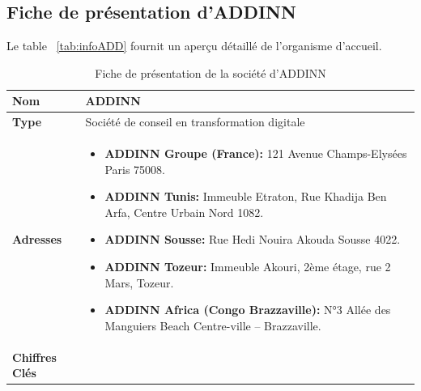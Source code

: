\subsection{Fiche de présentation d'ADDINN}
        Le table ~\ref{tab:infoADD} fournit un aperçu détaillé de l'organisme d'accueil.
        \begin{table}[H]
            \caption{\centering Fiche de présentation de la société d'ADDINN \cite{Addinn}\cite{apropos}} 
            \centering
            \renewcommand{\arraystretch}{1.5}
            \begin{tabular}{|p{2.3cm}|p{14cm}|}
                \hline
                    \textbf{Nom} & \textbf{ADDINN}\\
                \hline
                    \textbf{Type} & Société de conseil en transformation digitale\\
                \hline
                    \textbf{Adresses} & 
                        \begin{minipage}{14cm}
                            \begin{justify}
                                \vspace{0.15cm} 
                                \begin{itemize}[left=-0.1cm,label=$\bullet$]
                                    \item \textbf{ADDINN Groupe (France):} 121 Avenue Champs-Elysées Paris 75008.
                                    \item \textbf{ADDINN Tunis:} Immeuble Etraton, Rue Khadija Ben Arfa, Centre Urbain Nord 1082.
                                    \item \textbf{ADDINN Sousse:} Rue Hedi Nouira Akouda Sousse 4022.
                                    \item \textbf{ADDINN Tozeur:} Immeuble Akouri, 2ème étage, rue 2 Mars, Tozeur.
                                    \item \textbf{ADDINN Africa (Congo Brazzaville):} N°3 Allée des Manguiers Beach Centre-ville – Brazzaville.
                                \end{itemize}    
                                \vspace{0.15cm}        
                            \end{justify}
                        \end{minipage}\\
                \hline
                    \textbf{Chiffres Clés} & 
                        \begin{minipage}{14cm}

\end{minipage}
\end{tabular}
\end{table}
